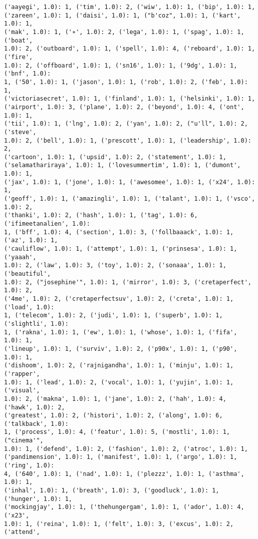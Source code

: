 \documentclass[11pt]{article}
\begin{document}
\begin{Verbatim}[commandchars=\\\{\}]
('aayegi', 1.0): 1, ('tim', 1.0): 2, ('wiw', 1.0): 1, ('bip', 1.0): 1,
('zareen', 1.0): 1, ('daisi', 1.0): 1, ("b'coz", 1.0): 1, ('kart', 1.0): 1,
('mak', 1.0): 1, ('∗', 1.0): 2, ('lega', 1.0): 1, ('spag', 1.0): 1, ('boat',
1.0): 2, ('outboard', 1.0): 1, ('spell', 1.0): 4, ('reboard', 1.0): 1, ('fire',
1.0): 2, ('offboard', 1.0): 1, ('sn16', 1.0): 1, ('9dg', 1.0): 1, ('bnf', 1.0):
1, ('50', 1.0): 1, ('jason', 1.0): 1, ('rob', 1.0): 2, ('feb', 1.0): 1,
('victoriasecret', 1.0): 1, ('finland', 1.0): 1, ('helsinki', 1.0): 1,
('airport', 1.0): 3, ('plane', 1.0): 2, ('beyond', 1.0): 4, ('ont', 1.0): 1,
('tii', 1.0): 1, ('lng', 1.0): 2, ('yan', 1.0): 2, ("u'll", 1.0): 2, ('steve',
1.0): 2, ('bell', 1.0): 1, ('prescott', 1.0): 1, ('leadership', 1.0): 2,
('cartoon', 1.0): 1, ('upsid', 1.0): 2, ('statement', 1.0): 1,
('selamathariraya', 1.0): 1, ('lovesummertim', 1.0): 1, ('dumont', 1.0): 1,
('jax', 1.0): 1, ('jone', 1.0): 1, ('awesomee', 1.0): 1, ('x24', 1.0): 1,
('geoff', 1.0): 1, ('amazingli', 1.0): 1, ('talant', 1.0): 1, ('vsco', 1.0): 2,
('thanki', 1.0): 2, ('hash', 1.0): 1, ('tag', 1.0): 6, ('ifimeetanalien', 1.0):
1, ('bff', 1.0): 4, ('section', 1.0): 3, ('follbaaack', 1.0): 1, ('az', 1.0): 1,
('cauliflow', 1.0): 1, ('attempt', 1.0): 1, ('prinsesa', 1.0): 1, ('yaaah',
1.0): 2, ('law', 1.0): 3, ('toy', 1.0): 2, ('sonaaa', 1.0): 1, ('beautiful',
1.0): 2, ("josephine'", 1.0): 1, ('mirror', 1.0): 3, ('cretaperfect', 1.0): 2,
('4me', 1.0): 2, ('cretaperfectsuv', 1.0): 2, ('creta', 1.0): 1, ('load', 1.0):
1, ('telecom', 1.0): 2, ('judi', 1.0): 1, ('superb', 1.0): 1, ('slightli', 1.0):
1, ('rakna', 1.0): 1, ('ew', 1.0): 1, ('whose', 1.0): 1, ('fifa', 1.0): 1,
('lineup', 1.0): 1, ('surviv', 1.0): 2, ('p90x', 1.0): 1, ('p90', 1.0): 1,
('dishoom', 1.0): 2, ('rajnigandha', 1.0): 1, ('minju', 1.0): 1, ('rapper',
1.0): 1, ('lead', 1.0): 2, ('vocal', 1.0): 1, ('yujin', 1.0): 1, ('visual',
1.0): 2, ('makna', 1.0): 1, ('jane', 1.0): 2, ('hah', 1.0): 4, ('hawk', 1.0): 2,
('greatest', 1.0): 2, ('histori', 1.0): 2, ('along', 1.0): 6, ('talkback', 1.0):
1, ('process', 1.0): 4, ('featur', 1.0): 5, ('mostli', 1.0): 1, ("cinema'",
1.0): 1, ('defend', 1.0): 2, ('fashion', 1.0): 2, ('atroc', 1.0): 1,
('pandimension', 1.0): 1, ('manifest', 1.0): 1, ('argo', 1.0): 1, ('ring', 1.0):
4, ('640', 1.0): 1, ('nad', 1.0): 1, ('plezzz', 1.0): 1, ('asthma', 1.0): 1,
('inhal', 1.0): 1, ('breath', 1.0): 3, ('goodluck', 1.0): 1, ('hunger', 1.0): 1,
('mockingjay', 1.0): 1, ('thehungergam', 1.0): 1, ('ador', 1.0): 4, ('x23',
1.0): 1, ('reina', 1.0): 1, ('felt', 1.0): 3, ('excus', 1.0): 2, ('attend',

\end{Verbatim}
\end{document}

